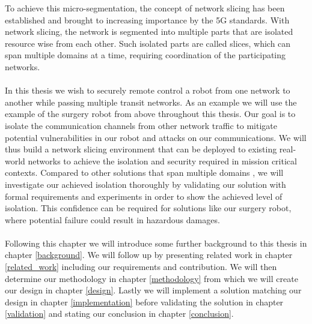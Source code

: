To achieve this micro-segmentation, the concept of network slicing \cite{slicing} has been established and brought to increasing importance by the 5G standards. With network slicing, the network is segmented into multiple parts that are isolated resource wise from each other. Such isolated parts are called slices, which can span multiple domains at a time, requiring coordination of the participating networks.

\paragraph{} In this thesis we wish to securely remote control a robot from one network to another while passing multiple transit networks. As an example we will use the example of the surgery robot from above throughout this thesis. Our goal is to isolate the communication channels from other network traffic to mitigate potential vulnerabilities in our robot and attacks on our communications. We will thus build a network slicing environment that can be deployed to existing real-world networks to achieve the isolation and security required in mission critical contexts. Compared to other solutions that span multiple domains \cite{MD1,MD2,MD3,MD4,MD5}, we will investigate our achieved isolation thoroughly by validating our solution with formal requirements and experiments in order to show the achieved level of isolation. This confidence can be required for solutions like our surgery robot, where potential failure could result in hazardous damages.

\paragraph{} Following this chapter we will introduce some further background to this thesis in chapter \ref{background}. We will follow up by presenting related work in chapter \ref{related_work} including our requirements and contribution. We will then determine our methodology in chapter \ref{methodology} from which we will create our design in chapter \ref{design}. Lastly we will implement a solution matching our design in chapter \ref{implementation} before validating the solution in chapter \ref{validation} and stating our conclusion in chapter \ref{conclusion}.
